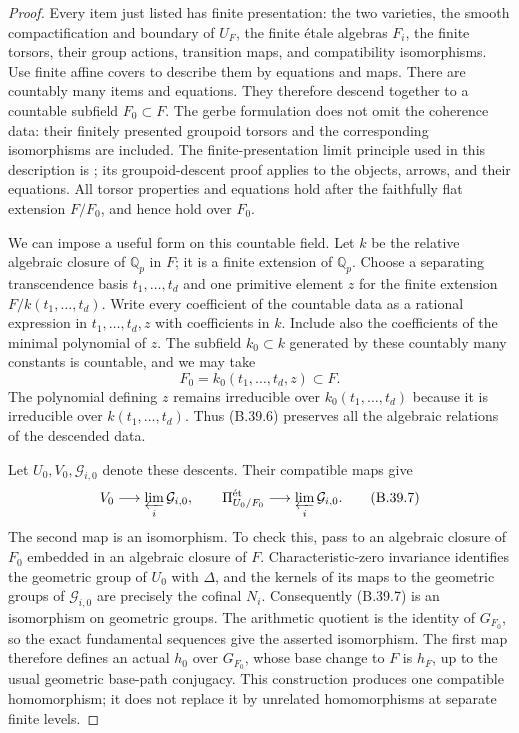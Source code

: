 \documentclass[11pt,oneside]{article}
\begin{document}
\begin{proof}
Every item just listed has finite presentation:
the two varieties, the smooth compactification and
boundary of $U_F$, the finite \'etale algebras $F_i$,
the finite torsors, their group actions, transition
maps, and compatibility isomorphisms. Use finite
affine covers to describe them by equations and
maps. There are countably many items and equations.
They therefore descend together to a countable
subfield $F_0\subset F$. The gerbe formulation
does not omit the coherence data: their finitely
presented groupoid torsors and the corresponding
isomorphisms are included. The finite-presentation
limit principle used in this description is
\cite[Lemma 102.3.7, Tag 0CMX]{B_StacksLimits};
its groupoid-descent proof applies to the objects,
arrows, and their equations. All torsor properties
and equations hold after the faithfully flat
extension $F/F_0$, and hence hold over $F_0$.

We can impose a useful form on this countable
field. Let $k$ be the relative algebraic closure
of $\mathbb Q_p$ in $F$; it is a finite extension
of $\mathbb Q_p$. Choose a separating transcendence
basis $t_1,\ldots,t_d$ and one primitive element
$z$ for the finite extension $F/k(t_1,\ldots,t_d)$.
Write every coefficient of the countable data as
a rational expression in $t_1,\ldots,t_d,z$ with
coefficients in $k$. Include also the coefficients
of the minimal polynomial of $z$. The subfield
$k_0\subset k$ generated by these countably many
constants is countable, and we may take
\[
 F_0=k_0(t_1,\ldots,t_d,z)\subset F.
 \tag{B.39.6}
\]
The polynomial defining $z$ remains irreducible
over $k_0(t_1,\ldots,t_d)$ because it is irreducible
over $k(t_1,\ldots,t_d)$. Thus (B.39.6) preserves
all the algebraic relations of the descended data.

Let $U_0,V_0,\mathcal G_{i,0}$ denote these descents.
Their compatible maps give
\[
 V_0\longrightarrow\varprojlim_i\mathcal G_{i,0},
 \qquad
 \Pi^{\mathrm{\acute et}}_{U_0/F_0}
       \longrightarrow\varprojlim_i\mathcal G_{i,0}.
 \tag{B.39.7}
\]
The second map is an isomorphism. To check this,
pass to an algebraic closure of $F_0$ embedded in
an algebraic closure of $F$. Characteristic-zero
invariance identifies the geometric group of
$U_0$ with $\Delta$, and the kernels of its maps
to the geometric groups of $\mathcal G_{i,0}$
are precisely the cofinal $N_i$. Consequently
(B.39.7) is an isomorphism on geometric groups.
The arithmetic quotient is the identity of
$G_{F_0}$, so the exact fundamental sequences
give the asserted isomorphism. The first map
therefore defines an actual $h_0$ over $G_{F_0}$,
whose base change to $F$ is $h_F$, up to the usual
geometric base-path conjugacy. This construction
produces one compatible homomorphism; it does not
replace it by unrelated homomorphisms at separate
finite levels.


\end{proof}
\end{document}

